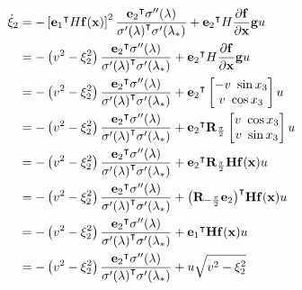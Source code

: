 \documentclass[oneside, 11pt]{book}
\begin{document}
\begin{align*}
    \dot{\xi}_2 &=
                    -\left[{\mathbf{e}_1}^{\intercal}H\mathbf{f}(\mathbf{x})\right]^2  \frac{{\mathbf{e}_2}^{\intercal}\sigma''(\lambda)}{{\sigma'(\lambda)}^{\intercal}\sigma'(\lambda_*)}
                    +
                    {\mathbf{e}_2}^{\intercal}H\frac{\partial\mathbf{f}}{\partial\mathbf{x}}\mathbf{g} u\\
                &=
                    -\left(v^2 - \xi_2^2\right) \frac{{\mathbf{e}_2}^{\intercal}\sigma''(\lambda)}{{\sigma'(\lambda)}^{\intercal}\sigma'(\lambda_*)}
                    +
                    {\mathbf{e}_2}^{\intercal}H\frac{\partial\mathbf{f}}{\partial\mathbf{x}}\mathbf{g} u\\
                &=
                    -\left(v^2 - \xi_2^2\right) \frac{{\mathbf{e}_2}^{\intercal}\sigma''(\lambda)}{{\sigma'(\lambda)}^{\intercal}\sigma'(\lambda_*)}
                    +
                    {\mathbf{e}_2}^{\intercal}
                        \begin{bmatrix}
                            -v~\sin x_3 \\
                            v~\cos x_3
                        \end{bmatrix}
                    u\\
                &=
                    -\left(v^2 - \xi_2^2\right) \frac{{\mathbf{e}_2}^{\intercal}\sigma''(\lambda)}{{\sigma'(\lambda)}^{\intercal}\sigma'(\lambda_*)}
                    +
                    {\mathbf{e}_2}^{\intercal}\mathbf{R}_{\frac{\pi}{2}}
                        \begin{bmatrix}
                            v~\cos x_3 \\
                            v~\sin x_3
                        \end{bmatrix}
                    u\\
                &=
                    -\left(v^2 - \xi_2^2\right) \frac{{\mathbf{e}_2}^{\intercal}\sigma''(\lambda)}{{\sigma'(\lambda)}^{\intercal}\sigma'(\lambda_*)}
                    +
                    {\mathbf{e}_2}^{\intercal}\mathbf{R}_{\frac{\pi}{2}}\mathbf{H}\mathbf{f}(\mathbf{x}) u\\
                &=
                    -\left(v^2 - \xi_2^2\right) \frac{{\mathbf{e}_2}^{\intercal}\sigma''(\lambda)}{{\sigma'(\lambda)}^{\intercal}\sigma'(\lambda_*)}
                    +
                    {\left(\mathbf{R}_{-\frac{\pi}{2}}\mathbf{e}_2\right)}^{\intercal}\mathbf{H}\mathbf{f}(\mathbf{x}) u\\
                &=
                    -\left(v^2 - \xi_2^2\right) \frac{{\mathbf{e}_2}^{\intercal}\sigma''(\lambda)}{{\sigma'(\lambda)}^{\intercal}\sigma'(\lambda_*)}
                    +
                    {\mathbf{e}_1}^{\intercal}\mathbf{H}\mathbf{f}(\mathbf{x}) u\\
                &=
                    -\left(v^2 - \xi_2^2\right) \frac{{\mathbf{e}_2}^{\intercal}\sigma''(\lambda)}{{\sigma'(\lambda)}^{\intercal}\sigma'(\lambda_*)}
                    +
                    u \sqrt{v^2 - \xi_2^2}\\
\end{align*}
\end{document}
